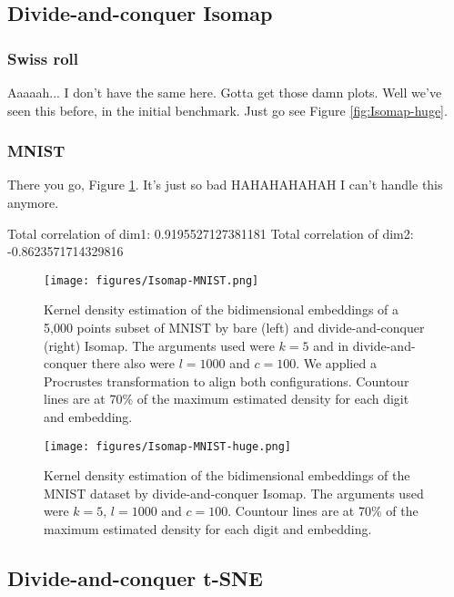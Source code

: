 \subsection{Divide-and-conquer Isomap}

\subsubsection{Swiss roll}

Aaaaah... I don't have the same here. Gotta get those damn plots. Well we've seen this before, in the initial benchmark. Just go see Figure \ref{fig:Isomap-huge}.

\subsubsection{MNIST}

There you go, Figure \ref{fig:Isomap-MNIST}. It's just so bad HAHAHAHAHAH I can't handle this anymore.

Total correlation of dim1: 0.9195527127381181
Total correlation of dim2: -0.8623571714329816

\begin{figure}[ht]
    \centering
    \texttt{[image: figures/Isomap-MNIST.png]}
    \caption{Kernel density estimation of the bidimensional embeddings of a 5,000 points subset of MNIST \citep{Cohen2017} by bare (left) and divide-and-conquer (right) Isomap. The arguments used were $k=5$ and in divide-and-conquer there also were $l=1000$ and $c=100$. We applied a Procrustes transformation to align both configurations. Countour lines are at 70\% of the maximum estimated density for each digit and embedding.}
    \label{fig:Isomap-MNIST}
\end{figure}

\begin{figure}[ht]
    \centering
    \texttt{[image: figures/Isomap-MNIST-huge.png]}
    \caption{Kernel density estimation of the bidimensional embeddings of the MNIST dataset \citep{Cohen2017} by divide-and-conquer Isomap. The arguments used were $k=5, \, l=1000$ and $c=100$. Countour lines are at 70\% of the maximum estimated density for each digit and embedding.}
    \label{fig:Isomap-MNIST-huge}
\end{figure}

\subsection{Divide-and-conquer t-SNE}

